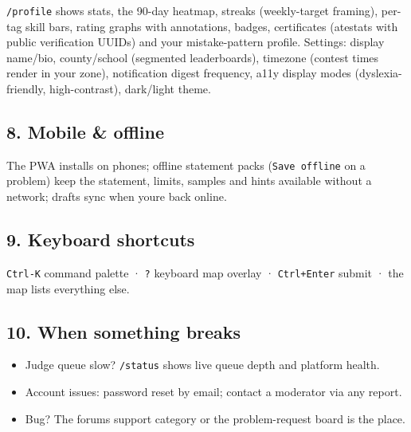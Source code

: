 \documentclass[
]{article}
\providecommand{\tightlist}{%
  \setlength{\itemsep}{0pt}\setlength{\parskip}{0pt}}
\begin{document}
\texttt{/profile} shows stats, the 90-day heatmap, streaks
(weekly-target framing), per-tag skill bars, rating graphs with
annotations, badges, certificates (atestats with public verification
UUIDs) and your mistake-pattern profile. Settings: display name/bio,
county/school (segmented leaderboards), timezone (contest times render
in your zone), notification digest frequency, a11y display modes
(dyslexia-friendly, high-contrast), dark/light theme.

\subsection{8. Mobile \& offline}\label{8-mobile--offline}

The PWA installs on phones; offline statement packs
(\texttt{Save\ offline} on a problem) keep the statement, limits,
samples and hints available without a network; drafts sync when
you\textquotesingle re back online.

\subsection{9. Keyboard shortcuts}\label{9-keyboard-shortcuts}

\texttt{Ctrl-K} command palette · \texttt{?} keyboard map overlay ·
\texttt{Ctrl+Enter} submit · the map lists everything else.

\subsection{10. When something breaks}\label{10-when-something-breaks}

\begin{itemize}
\tightlist
\item
  Judge queue slow? \texttt{/status} shows live queue depth and platform
  health.
\item
  Account issues: password reset by email; contact a moderator via any
  report.
\item
  Bug? The forum\textquotesingle s support category or the
  problem-request board is the place.
\end{itemize}
\end{document}

